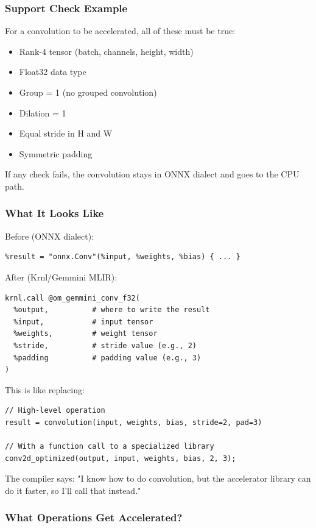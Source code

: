 \documentclass[12pt,a4paper]{article}
\begin{document}
\subsubsection{Support Check Example}
For a convolution to be accelerated, all of these must be true:
\begin{itemize}
  \item Rank-4 tensor (batch, channels, height, width)
  \item Float32 data type
  \item Group = 1 (no grouped convolution)
  \item Dilation = 1
  \item Equal stride in H and W
  \item Symmetric padding
\end{itemize}

If any check fails, the convolution stays in ONNX dialect and goes to the CPU path.

\subsubsection{What It Looks Like}
Before (ONNX dialect):
\begin{lstlisting}
%result = "onnx.Conv"(%input, %weights, %bias) { ... }
\end{lstlisting}

After (Krnl/Gemmini MLIR):
\begin{lstlisting}
krnl.call @om_gemmini_conv_f32(
  %output,          # where to write the result
  %input,           # input tensor
  %weights,         # weight tensor
  %stride,          # stride value (e.g., 2)
  %padding          # padding value (e.g., 3)
)
\end{lstlisting}

\begin{analogyenv}
This is like replacing:
\begin{lstlisting}
// High-level operation
result = convolution(input, weights, bias, stride=2, pad=3)

// With a function call to a specialized library
conv2d_optimized(output, input, weights, bias, 2, 3);
\end{lstlisting}
The compiler says: "I know how to do convolution, but the accelerator library can do it faster, so I'll call that instead."
\end{analogyenv}

\subsubsection{What Operations Get Accelerated?}
\end{document}
